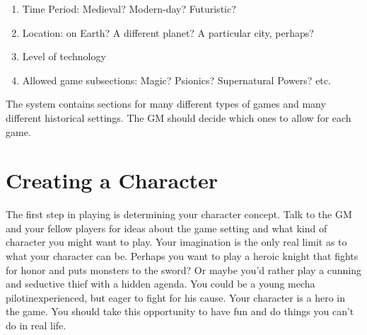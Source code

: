 \documentclass[twoside]{book}
\begin{document}
\begin{enumerate}
      
  \item   
                
    {  
    Time Period: Medieval? Modern-day? Futuristic?
                 
    }
  
            
  \item   
                
    {  
     Location: on Earth? A different planet? A
                 particular city, perhaps? 
    }
  
            
  \item   
              
    {  
     Level of technology 
    }
    
            
  \item   
                
    {  
     Allowed game subsections: Magic? Psionics?
                 Supernatural Powers? etc. 
    }
  
            
\end{enumerate}
  
    {  
    The \APATHY{}  system contains sections for many
            different types of games and many different historical
            settings. The GM should decide which ones to allow for each
            game.
          
    }
  
    

\section{Creating a Character}
    
    {  
    The first step in playing \APATHY{}  is determining
            your character concept. Talk to the GM and your fellow
            players for ideas about the game setting and what kind of
            character you might want to play. Your imagination is the
            only real limit as to what your character can be. Perhaps you
            want to play a heroic knight that fights for honor and puts
            monsters to the sword? Or maybe you'd rather play a
            cunning and seductive thief with a hidden agenda. You could
            be a young mecha pilotinexperienced, but eager to
            fight for his cause. Your character is a hero in the game.
            You should take this opportunity to have fun and do things
            you can't do in real life.
          
    }
  
\end{document}
